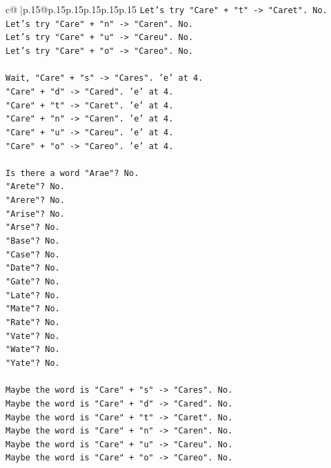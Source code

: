 \documentclass{article}
\begin{document}
{\begin{supertabular}{c@{$\;$}|p{.15\linewidth}@{}p{.15\linewidth}p{.15\linewidth}p{.15\linewidth}p{.15\linewidth}p{.15\linewidth}}
{{{\texttt{Let's try "Care" + "t" {-}> "Caret". No.} \\
\texttt{Let's try "Care" + "n" {-}> "Caren". No.} \\
\texttt{Let's try "Care" + "u" {-}> "Careu". No.} \\
\texttt{Let's try "Care" + "o" {-}> "Careo". No.} \\
\\ 
\texttt{Wait, "Care" + "s" {-}> "Cares". 'e' at 4.} \\
\texttt{"Care" + "d" {-}> "Cared". 'e' at 4.} \\
\texttt{"Care" + "t" {-}> "Caret". 'e' at 4.} \\
\texttt{"Care" + "n" {-}> "Caren". 'e' at 4.} \\
\texttt{"Care" + "u" {-}> "Careu". 'e' at 4.} \\
\texttt{"Care" + "o" {-}> "Careo". 'e' at 4.} \\
\\ 
\texttt{Is there a word "Arae"? No.} \\
\texttt{"Arete"? No.} \\
\texttt{"Arere"? No.} \\
\texttt{"Arise"? No.} \\
\texttt{"Arse"? No.} \\
\texttt{"Base"? No.} \\
\texttt{"Case"? No.} \\
\texttt{"Date"? No.} \\
\texttt{"Gate"? No.} \\
\texttt{"Late"? No.} \\
\texttt{"Mate"? No.} \\
\texttt{"Rate"? No.} \\
\texttt{"Vate"? No.} \\
\texttt{"Wate"? No.} \\
\texttt{"Yate"? No.} \\
\\ 
\texttt{Maybe the word is "Care" + "s" {-}> "Cares". No.} \\
\texttt{Maybe the word is "Care" + "d" {-}> "Cared". No.} \\
\texttt{Maybe the word is "Care" + "t" {-}> "Caret". No.} \\
\texttt{Maybe the word is "Care" + "n" {-}> "Caren". No.} \\
\texttt{Maybe the word is "Care" + "u" {-}> "Careu". No.} \\
\texttt{Maybe the word is "Care" + "o" {-}> "Careo". No.} \\
}}}
\end{supertabular}}
\end{document}
